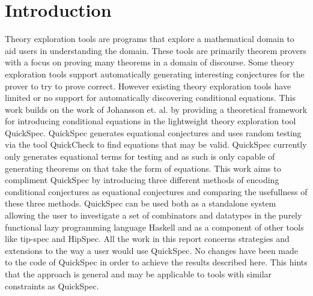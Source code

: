 \section{Introduction}
Theory exploration tools are programs that
explore a mathematical domain to aid users in
understanding the domain. %
These tools are primarily theorem provers with a focus
on proving many theorems in a domain of discourse.
Some theory exploration tools support automatically generating
interesting conjectures for the prover to try to prove correct.
However existing theory exploration tools have limited or no
support for automatically discovering conditional equations. %
This work builds on the work of Johansson et. al. %
by providing a theoretical framework for introducing conditional
equations in the lightweight theory exploration tool QuickSpec. %
QuickSpec generates equational conjectures and uses random testing via the tool QuickCheck %
to find equations that may be valid. QuickSpec currently only generates
equational terms for testing and as such is only capable of generating
theorems on that take the form of equations. 
This work aims to compliment QuickSpec by introducing three different methods
of encoding conditional conjectures as equational conjectures and comparing
the usefullness of these three methods. QuickSpec can be used both as a standalone
system allowing the user to investigate a set of combinators and datatypes in the
purely functional lazy programming language Haskell and as a component of other tools %
like tip-spec and HipSpec. %
All the work in this report concerns strategies and extensions to the way a user would
use QuickSpec. No changes have been made to the code of QuickSpec in order to
achieve the results described here. This hints that the approach is general
and may be applicable to tools with similar constraints as QuickSpec.
